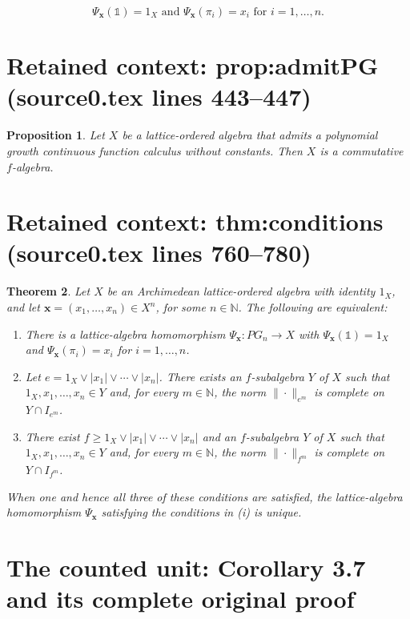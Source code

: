 \documentclass[10pt,a4paper]{amsart}
\newcommand\N{\ensuremath{\mathbb{N}}}
\newcommand{\Psx}{\Psi_{\bm x}}
\newcommand{\falg}{$f\!$-algebra}
\newcommand{\one}{\mathbb{1}}
\theoremstyle{plain}
\newtheorem{thm}{Theorem}
\newtheorem{prop}[thm]{Proposition}
\theoremstyle{definition}
\theoremstyle{remark}
\begin{document}
    \begin{equation}\label{eq:proj_one}
            \Psx(\one)=1_X \text{ and }
\Psx(\pi _i)=x_i\text{ for }i=1,\ldots ,n.
    \end{equation}


\section*{Retained context: prop:admitPG (source0.tex lines 443--447)}

\begin{prop}\label{prop:admitPG}
    Let $X$ be a lattice-ordered algebra that admits a polynomial
    growth continuous function calculus without constants. Then $X$ is a commutative
    \falg.
\end{prop}


\section*{Retained context: thm:conditions (source0.tex lines 760--780)}

\begin{thm}\label{thm:conditions}
    Let $X$ be an Archimedean lattice-ordered algebra with identity $1_X$,
    and let $\bm x = (x_1,\ldots ,x_n)\in X^{n}$, for some $n \in \N$.
    The following are equivalent:
    \begin{enumerate}
    \item There is a lattice-algebra homomorphism $\Psx\colon
        PG_n\to X$ with $\Psx(\one)=1_X$ and $\Psx(\pi _i)=x_i$
        for $i=1,\ldots ,n$.
    \item Let $e=1_X\vee |x_1|\vee \cdots \vee |x_n|$. There exists an
        $f\!$-subalgebra $Y$ of $X$ such that $1_X,x_1,\ldots ,x_n \in
        Y$ and, for every $m \in \N$, the norm $\|{\cdot }\|_{e^{m}}$
        is complete on $Y\cap I_{e^{m}}$.
    \item There exist $f\ge 1_X\vee |x_1|\vee \cdots \vee |x_n|$ and an
        $f\!$-subalgebra $Y$ of $X$ such that $1_X,x_1,\ldots ,x_n \in
        Y$ and, for every $m \in \N$, the norm $\|{\cdot }\|_{f^{m}}$
        is complete on $Y\cap I_{f^{m}}$.
    \end{enumerate}
    When one and hence all three of these conditions are satisfied,
    the lattice-algebra homomorphism $\Psx$ satisfying the conditions
    in \textit{(i)} is unique.
\end{thm}


\section{The counted unit: Corollary 3.7 and its complete original proof}
\end{document}
